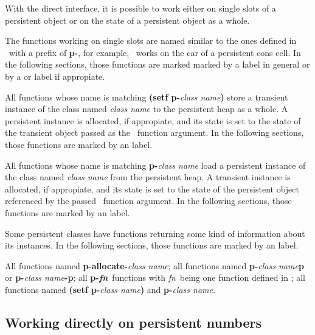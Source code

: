 With the direct interface, it is possible to work either on single
slots of a persistent object or on the state of a persistent object as
a whole.

The functions working on single slots are named similar to the ones
defined in \cite{bib:CLtLII}\ with a prefix of \textbf{p-}, for
example, \ works on the car of a persistent cons cell. In
the following sections, those functions are marked marked by a
\textbf{\SlotAccessorLabel} label in general or by a
\textbf{\SlotReaderLabel} or \textbf{\SlotWriterLabel} label if
appropiate.

All functions whose name is matching \textbf{(setf p-}\emph{\lt{}class
  name\gt}\textbf{)} store a transient instance of the class named
\emph{\lt{}class name\gt} to the persistent heap as a whole. A
persistent instance is allocated, if appropiate, and its state is set
to the state of the transient object passed as the \ 
function argument.  In the following sections, those functions are
marked by an \textbf{\ObjectStoreLabel} label.

All functions whose name is matching \textbf{p-}\emph{\lt{}class
  name\gt} load a persistent instance of the class named
\emph{\lt{}class name\gt} from the persistent heap. A transient
instance is allocated, if appropiate, and its state is set to the
state of the persistent object referenced by the passed \objid\ 
function argument.  In the following sections, those functions are
marked by an \textbf{\ObjectLoadLabel} label.

Some persistent classes have functions returning some kind of
information about its instances. In the following sections, those
functions are marked by an \textbf{\InformationLabel} label.

 All functions named \textbf{p-allocate-}\emph{\lt{}class
  name\gt}; all functions named \textbf{p-}\emph{\lt{}class
  name\gt}\textbf{p} or \textbf{p-}\emph{\lt{}class
  name\gt}\textbf{-p}; all \textbf{p-\hbox{\lt\emph{fn}\gt}}\ 
functions with \lt\emph{fn}\gt\ being one function defined in
\cite{bib:CLtLII}; all functions named \textbf{(setf p-}\emph{\lt{}class
  name\gt}\textbf{)} and \textbf{p-}\emph{\lt{}class name\gt}.

\subsection[Persistent numbers]{Working directly on persistent
  numbers}

